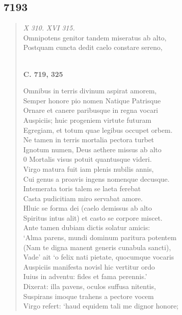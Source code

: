 \documentclass[11pt, a4paper]{report}
\begin{document}
            \subsection*{7193}
      \begin{verse}
      \textit{X 310. XVI 315.} \\ Omnipotens genitor tandem miseratus ab alto, \\ Postquam cuncta dedit caelo constare sereno, \\ 
        ﻿\pagebreak 
    \begin{center} \textbf{C. 719, 325} \end{center} \marginpar{[185]} Omnibus in terris divinum aspirat amorem, \\ Semper honore pio nomen Natique Patrisque \\ Ornare et canere paribusque in regna vocari \\ Auspiciis; huic progeniem virtute futuram \\ Egregiam, et totum quae legibus occupet orbem. \\ Ne tamen in terris mortalia pectora turbet \\ Ignotum numen, Deus aethere missus ab alto \\ 0 Mortalis visus potuit quantusque videri. \\ Virgo matura fuit iam plenis nubilis annis, \\ Cui genus a proavis ingens nomenque decusque. \\ Intemerata toris talem se laeta ferebat \\ Casta pudicitiam miro servabat amore. \\ Hluic se forma dei (caelo demissus ab alto \\ Spiritus intus alit) et casto se corpore miscet. \\ Ante tamen dubiam dictis solatur amicis: \\ ‘Alma parens, mundi dominum paritura potentem \\ (Nam te digna manent generis cunabula sancti), \\ Vade’ ait ‘o felix nati pietate, quocumque vocaris \\ Auspiciis manifesta novisl hic vertitur ordo \\ Iuius in adventu: fides et fama perennis.’ \\ Dixerat: illa pavens, oculos suffusa nitentis, \\ Suspirans imoque trahens a pectore vocem \\ Virgo refert: ‘haud equidem tali me dignor honore; \\ 

\end{verse}
\end{document}
